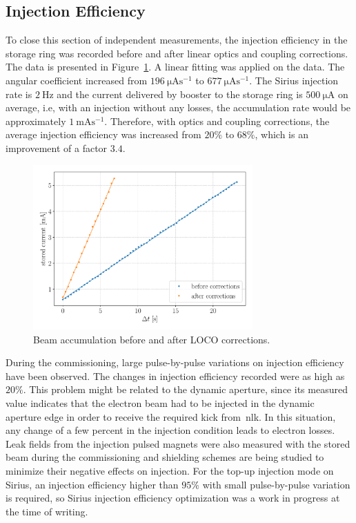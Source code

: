 \subsection{Injection Efficiency}
To close this section of independent measurements, the injection efficiency in the storage ring was recorded before and after linear optics and coupling corrections. The data is presented in Figure~\ref{fig:injeff}. A linear fitting was applied on the data. The angular coefficient increased from $\SI{196}{\micro\ampere\second^{-1}}$ to $\SI{677}{\micro\ampere\second^{-1}}$. The Sirius injection rate is $\SI{2}{\hertz}$ and the current delivered by booster to the storage ring is $\SI{500}{\micro\ampere}$ on average, i.e, with an injection without any losses, the accumulation rate would be approximately $\SI{1}{\milli\ampere\second^{-1}}$. Therefore, with optics and coupling corrections, the average injection efficiency was increased from $20\%$ to $68\%$, which is an improvement of a factor $3.4$.
\begin{figure}
\centering
\includegraphics[width=0.75\textwidth]{figures/injeff_grid.pdf}
\caption{Beam accumulation before and after LOCO corrections.}
\label{fig:injeff}
\end{figure}
During the commissioning, large pulse-by-pulse variations on injection efficiency have been observed. The changes in injection efficiency recorded were as high as $20\%$. This problem might be related to the dynamic aperture, since its measured value indicates that the electron beam had to be injected in the dynamic aperture edge in order to receive the required kick from~\gls{nlk}. In this situation, any change of a few percent in the injection condition leads to electron losses. Leak fields from the injection pulsed magnets were also measured with the stored beam during the commissioning and shielding schemes are being studied to minimize their negative effects on injection. For the top-up injection mode on Sirius, an injection efficiency higher than $95\%$ with small pulse-by-pulse variation is required, so Sirius injection efficiency optimization was a work in progress at the time of writing. 

